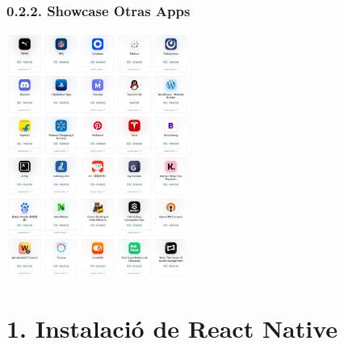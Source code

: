 \documentclass[12pt]{beamer}
\begin{document}
	\subsubsection{0.2.2. Showcase Otras Apps}
	\begin{frame}
		\centering\includegraphics[height=8cm]{Showcase2.JPG}
	\end{frame}
	\section{1. Instalació de React Native}
	\subsection{}
	\subsubsection{}
	\begin{frame}
	\end{frame}
	\
\end{document}
